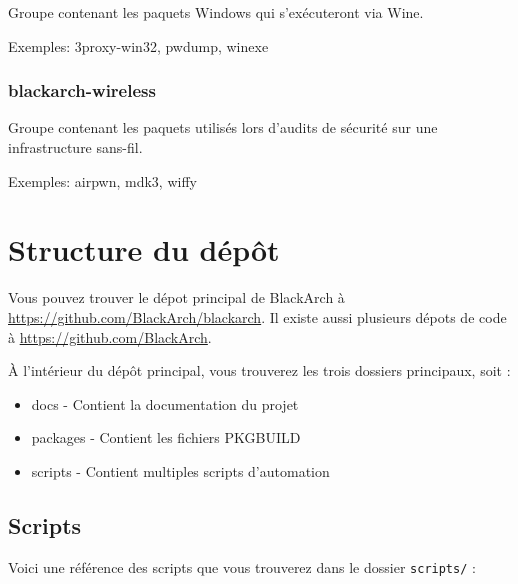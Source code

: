 \documentclass[a4paper, oneside, 11pt]{book}
\begin{document}
Groupe contenant les paquets Windows qui s'exécuteront via Wine.

Exemples: 3proxy-win32, pwdump, winexe

\subsubsection{blackarch-wireless}

Groupe contenant les paquets utilisés lors d'audits de sécurité sur une
infrastructure sans-fil.

Exemples: airpwn, mdk3, wiffy

\section{Structure du dépôt}

Vous pouvez trouver le dépot principal de BlackArch à
\href{https://github.com/BlackArch/blackarch}
{https://github.com/BlackArch/blackarch}. Il existe aussi plusieurs dépots de
code à \href{https://github.com/BlackArch}{https://github.com/BlackArch}.

À l'intérieur du dépôt principal, vous trouverez les trois dossiers principaux,
soit :

\begin{itemize}
\item docs - Contient la documentation du projet
\item packages - Contient les fichiers PKGBUILD
\item scripts - Contient multiples scripts d'automation
\end{itemize}

\subsection{Scripts}

Voici une référence des scripts que vous trouverez dans le dossier
\verb|scripts/| :
\end{document}
